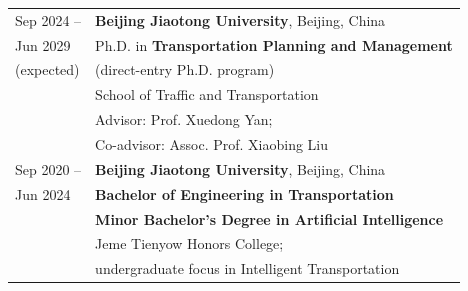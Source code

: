 \begin{longtable}[l]{@{}p{}@{\hspace{1em}}>{\RaggedRight\arraybackslash}p{}@{}}
Sep 2024 -- & \textbf{Beijing Jiaotong University}, Beijing, China\\
Jun 2029 & Ph.D. in \textbf{Transportation Planning and Management}\\
(expected) & (direct-entry Ph.D. program)\\
& School of Traffic and Transportation\\
& Advisor: Prof. Xuedong Yan;\\
& Co-advisor: Assoc. Prof. Xiaobing Liu\\[4pt]
Sep 2020 -- & \textbf{Beijing Jiaotong University}, Beijing, China\\
Jun 2024 & \textbf{Bachelor of Engineering in Transportation}\\
& \textbf{Minor Bachelor's Degree in Artificial Intelligence}\\
& Jeme Tienyow Honors College;\\
& undergraduate focus in Intelligent Transportation
\end{longtable}
